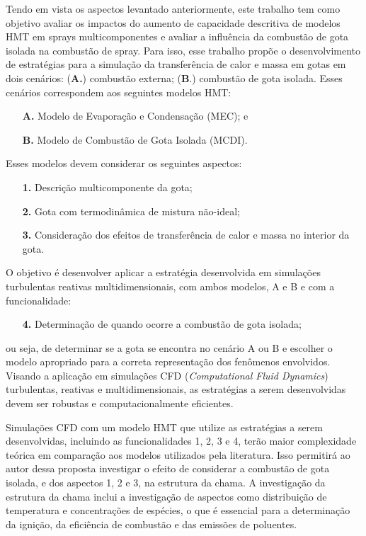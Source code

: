 Tendo em vista os aspectos levantado anteriormente, este trabalho tem como objetivo avaliar os impactos do aumento de capacidade descritiva de modelos HMT em sprays multicomponentes e avaliar a influência da combustão de gota isolada na combustão de spray.
Para isso, esse trabalho propõe o desenvolvimento de estratégias para a simulação da transferência de calor e massa em gotas em dois cenários: (\textbf{A.}) combustão externa; (\textbf{B}.) combustão de gota isolada.
Esses cenários correspondem aos seguintes modelos HMT:
\begin{enumerate}
    \item[\textbf{A.}] Modelo de Evaporação e Condensação (MEC); e 
    \item[\textbf{B.}] Modelo de Combustão de Gota Isolada (MCDI).
\end{enumerate}
Esses modelos devem considerar os seguintes aspectos: 
\begin{enumerate}
    \item[\textbf{1.}] Descrição multicomponente da gota; 
    \item[\textbf{2.}] Gota com termodinâmica de mistura não-ideal; 
    \item[\textbf{3.}] Consideração dos efeitos de transferência	de calor e massa no interior da gota. 
\end{enumerate}
O objetivo é desenvolver aplicar a estratégia desenvolvida em simulações turbulentas reativas multidimensionais, com ambos modelos, {A} e {B} e com a funcionalidade:
\begin{enumerate}
    \item[\textbf{4.}] Determinação de quando ocorre a combustão de gota isolada;
\end{enumerate}
ou seja, de determinar se a gota se encontra no cenário {A} ou {B} e escolher o modelo apropriado para a correta representação dos fenômenos envolvidos.
Visando a aplicação em simulações CFD (\emph{Computational Fluid Dynamics}) turbulentas, reativas e multidimensionais, as estratégias a serem desenvolvidas devem ser robustas e computacionalmente eficientes.

Simulações CFD com um modelo HMT que utilize as estratégias a serem desenvolvidas, incluindo as funcionalidades {1}, {2}, {3} e {4}, terão maior complexidade teórica em comparação aos modelos utilizados pela literatura. 
Isso permitirá ao autor dessa proposta investigar o efeito de considerar a combustão de gota isolada, e dos aspectos {1}, {2} e {3}, na estrutura da chama.
A investigação da estrutura da chama inclui a investigação de aspectos como distribuição de temperatura e concentrações de espécies, o que é essencial para a determinação da ignição, da eficiência de combustão e das emissões de poluentes.


